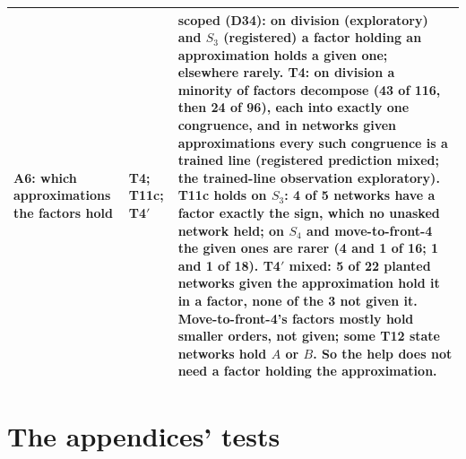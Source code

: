 \documentclass[11pt]{article}
\begin{document}
\begin{center}
\begin{tabularx}{\textwidth}{p{}lX}
A6: which approximations the factors hold & T4; T11c; T4$'$ & \textbf{scoped} (D34): on division
(exploratory) and $S_3$ (registered) a factor holding an approximation holds a given one; elsewhere
rarely. T4: on division a minority of
factors decompose (43 of 116, then 24 of 96), each into exactly one congruence, and in networks given
approximations every such congruence is a trained line (registered prediction mixed; the
trained-line observation exploratory). \textbf{T11c holds on $S_3$}: 4 of 5
networks have a factor exactly the sign, which no unasked network held; on $S_4$ and
move-to-front-4 the given ones are rarer (4 and 1 of 16; 1 and 1 of 18). \textbf{T4$'$ mixed}: 5 of
22 planted networks given the approximation hold it in a factor, none of the 3 not given it. Move-to-front-4's
factors mostly hold smaller orders, not given; some T12 state networks hold $A$ or $B$. So the help
does not need a factor holding the approximation. \\
\bottomrule
\end{tabularx}
\end{center}

\section{The appendices' tests}
\end{document}
